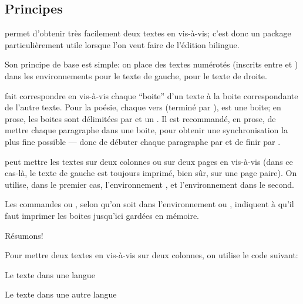 \subsection{Principes}

 permet d'obtenir très facilement deux textes en vis-à-vis; c'est donc un package particulièrement utile lorsque l'on veut faire de l'édition bilingue.

Son principe de base est simple: on place des textes numérotés (inscrits entre  et ) dans les environnements  pour le texte de gauche,   pour le texte de droite.

 fait correspondre en vis-à-vis chaque \enquote{boite} d'un texte à la boite correspondante de l'autre texte. Pour la poésie,  chaque vers  (terminé par \ampersand ), est une boite;  en prose, les boites sont délimitées par   et un .  Il est recommandé, en prose, de mettre chaque paragraphe dans une boite, pour obtenir une synchronisation la plus fine possible --- donc de débuter chaque paragraphe par  et de finir par . 


 peut mettre les textes sur deux colonnes ou sur deux pages en vis-à-vis (dans ce cas-là, le texte de gauche est toujours imprimé, bien sûr, sur une page paire).
On utilise, dans le premier cas, l'environnement , et l'environnement  dans le second.

Les commandes  ou , selon qu'on soit dans l'environnement  ou , indiquent à \latex qu'il faut imprimer les boites jusqu'ici gardées en mémoire. 



\bigbreak

Résumons!

Pour mettre deux textes en vis-à-vis sur deux colonnes, on utilise le code suivant: 

\begin{latexcode*}

\begin{pages}  %
\begin{Leftside} %
 \beginnumbering %
 \pstart %
 
Le texte dans une langue 
 
 \pend
 \endnumbering  %
 \end{Leftside} %
 
 \begin{Rightside}  %
 \beginnumbering
 \pstart
 
 Le texte dans une autre langue
 
 \pend
 \endnumbering
 \end{Rightside} 
 \Pages

  \end{pages} %
\end{latexcode*}


